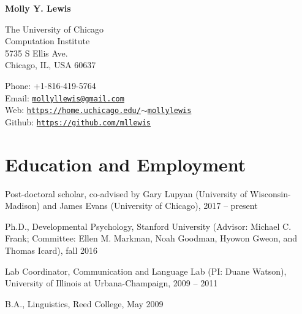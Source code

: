 \documentclass[letterpaper]{article}
\def\name{Molly Y.  Lewis}
\renewenvironment{itemize}{
  \begin{list}{}{
    \setlength{\leftmargin}{1.5em}
  }
}{
  \end{list}
}
\begin{document}
\centerline{\huge \bf \name}
\vspace{0.25in}

 \normalsize
  
  \begin{multicols}{2}
\begin{flushleft}
  The University of Chicago  \\
  Computation Institute \\
  5735 S Ellis Ave.\\
 Chicago, IL, USA 60637\\
\end{flushleft}
\begin{flushleft}
Phone:  +1-816-419-5764\\
Email: \href{mailto:mollyllewis@gmail.com}{\tt mollyllewis@gmail.com}\\
Web: \href{http://home.uchicago.edu/~mollylewis}{\tt https://home.uchicago.edu/$\sim$mollylewis}\\
Github: \href{https://github.com/mllewis}{\tt https://github.com/mllewis}\\
\end{flushleft}
 
\end{multicols}


\section*{Education and Employment}
\begin{itemize}
\item Post-doctoral scholar, co-advised by Gary Lupyan (University of Wisconsin-Madison) and  James Evans (University of Chicago), 2017 -- present


  \item Ph.D., Developmental Psychology, Stanford University (Advisor: Michael C. Frank; Committee: Ellen M. Markman, Noah Goodman, Hyowon Gweon, and Thomas Icard),  fall 2016 
   \item Lab Coordinator, Communication and Language Lab (PI: Duane Watson), University of Illinois at Urbana-Champaign,  2009 -- 2011
  \item  B.A., Linguistics, Reed College, May 2009
  \end{itemize}
  
\end{document}
